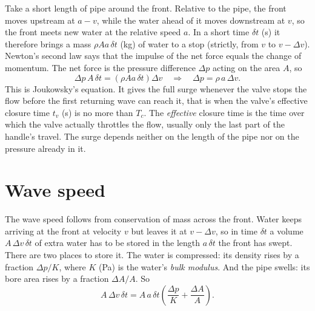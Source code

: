 \documentclass[a4paper,justified,nobib]{tufte-handout}
\newcommand{\sidecite}[2][]{\sidenote{\citet{#2}\ifx&#1&\else, #1\fi.}}
\begin{document}
Take a short length of pipe around the front. Relative to the pipe, the front
moves upstream at $a-v$, while the water ahead of it moves downstream at $v$, so
the front meets new water at the relative speed $a$. In a short time $\delta t$
(s) it therefore brings a mass $\rho A a\,\delta t$ (kg) of water to a stop
(strictly, from $v$ to $v-\Delta v$). Newton's second law says that the
impulse of the net force equals the change of momentum. The net force is the
pressure difference $\Delta p$ acting on the area $A$, so
\begin{equation}
  \Delta p\,A\,\delta t = \left(\rho A a\,\delta t\right)\Delta v
  \quad\Longrightarrow\quad
  \Delta p = \rho\,a\,\Delta v .
  \label{eq:joukowsky}
\end{equation}
This is Joukowsky's equation.\sidecite{joukowsky1904} It gives the full surge
whenever the valve stops the flow before the first returning wave can reach it,
that is when the valve's effective closure time $t_v$ (s) is no more than
$T_c$. The \emph{effective} closure time is the time over which the valve
actually throttles the flow, usually only the last part of the handle's
travel. The surge depends neither on the length of the pipe nor on the
pressure already in it.

\section{Wave speed}
\label{sec:wavespeed}

The wave speed follows from conservation of mass across the front. Water keeps
arriving at the front at velocity $v$ but leaves it at $v-\Delta v$, so in time
$\delta t$ a volume $A\,\Delta v\,\delta t$ of extra water has to be stored in
the length $a\,\delta t$ the front has swept. There are two places to store it.
The water is compressed: its density rises by a fraction $\Delta p/K$, where $K$
(Pa) is the water's \emph{bulk modulus}. And the pipe swells: its bore area
rises by a fraction $\Delta A/A$. So
\begin{equation}
  A\,\Delta v\,\delta t = A\,a\,\delta t\left(\frac{\Delta p}{K}+\frac{\Delta A}{A}\right).
  \label{eq:mass}
\end{equation}
\end{document}
